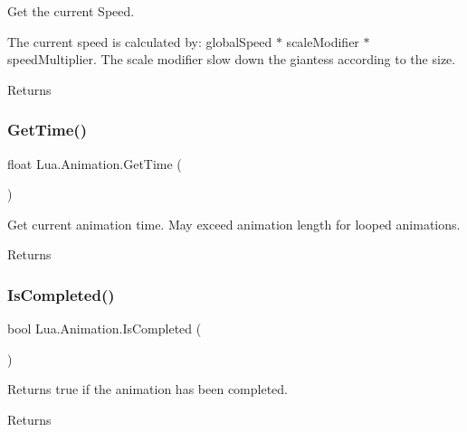 Get the current Speed. 

The current speed is calculated by\+: global\+Speed $\ast$ scale\+Modifier $\ast$ speed\+Multiplier. The scale modifier slow down the giantess according to the size. \begin{DoxyReturn}{Returns}

\end{DoxyReturn}
\mbox{\label{class_lua_1_1_animation_ad7c23e47dae3b3c354d317724e93e887}} 
\subsubsection{\texorpdfstring{GetTime()}{GetTime()}}
{\footnotesize\ttfamily float Lua.\+Animation.\+Get\+Time (\begin{DoxyParamCaption}{ }\end{DoxyParamCaption})}



Get current animation time. May exceed animation length for looped animations. 

\begin{DoxyReturn}{Returns}

\end{DoxyReturn}
\mbox{\label{class_lua_1_1_animation_afd07956e9f1dc6f551d8ca036493a646}} 
\subsubsection{\texorpdfstring{IsCompleted()}{IsCompleted()}}
{\footnotesize\ttfamily bool Lua.\+Animation.\+Is\+Completed (\begin{DoxyParamCaption}{ }\end{DoxyParamCaption})}



Returns true if the animation has been completed. 

\begin{DoxyReturn}{Returns}

\end{DoxyReturn}
\mbox{\label{class_lua_1_1_animation_aede5bb0940e1daed76c816ba30dac6f2}} 
